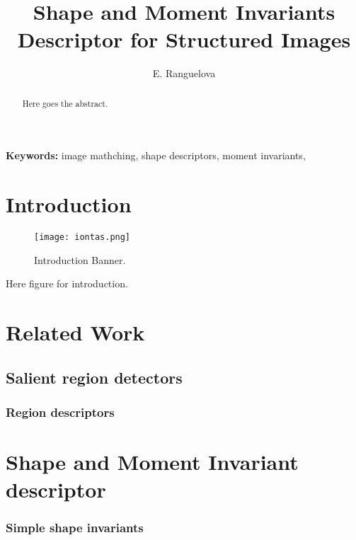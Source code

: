 \documentclass[a4paper,11pt]{article}
\begin{document}
\title{Shape and Moment Invariants Descriptor for Structured Images}

\author{E. Ranguelova}
\date{}
\maketitle
\thispagestyle{empty}



\begin{abstract}
Here goes the abstract.
\end{abstract}
\textbf{Keywords:} image mathching, shape descriptors, moment invariants, 



\section{Introduction}
\begin{wrapfigure}{r}{0.5\textwidth}
  \vspace{-20pt}
  \begin{center}
    \texttt{[image: iontas.png]}
\end{center}
\vspace{-20pt}
  \caption{Introduction Banner.}
  \vspace{-0pt}
\end{wrapfigure}
Here figure for introduction.

\section{Related Work}


\subsection{Salient region detectors}


\subsubsection{Region descriptors}


\section{Shape and Moment Invariant descriptor}

\subsubsection{Simple shape invariants}
\end{document}
